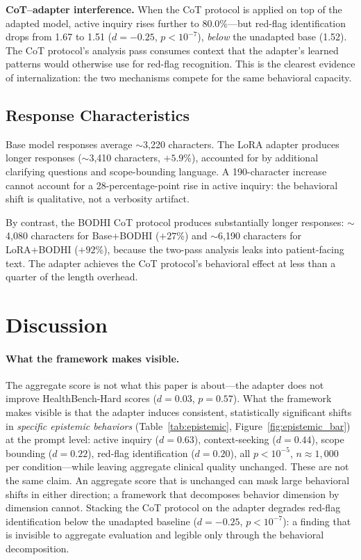 \documentclass{article}
\newcommand{\bodhi}{BODHI}
\begin{document}
\textbf{CoT--adapter interference.} When the CoT protocol is applied on top of the adapted model, active inquiry rises further to 80.0\%---but red-flag identification drops from 1.67 to 1.51 ($d = -0.25$, $p < 10^{-7}$), \emph{below} the unadapted base (1.52). The CoT protocol's analysis pass consumes context that the adapter's learned patterns would otherwise use for red-flag recognition. This is the clearest evidence of internalization: the two mechanisms compete for the same behavioral capacity.

\subsection{Response Characteristics}

Base model responses average ${\sim}$3,220 characters. The LoRA adapter produces longer responses (${\sim}$3,410 characters, $+5.9$\%), accounted for by additional clarifying questions and scope-bounding language. A 190-character increase cannot account for a 28-percentage-point rise in active inquiry: the behavioral shift is qualitative, not a verbosity artifact.

By contrast, the \bodhi{} CoT protocol produces substantially longer responses: ${\sim}$4,080 characters for Base+\bodhi{} ($+27$\%) and ${\sim}$6,190 characters for LoRA+\bodhi{} ($+92$\%), because the two-pass analysis leaks into patient-facing text. The adapter achieves the CoT protocol's behavioral effect at less than a quarter of the length overhead.



\section{Discussion}
\label{sec:discussion}

\paragraph{What the framework makes visible.} The aggregate score is not what this paper is about---the adapter does not improve HealthBench-Hard scores ($d=0.03$, $p=0.57$). What the framework makes visible is that the adapter induces consistent, statistically significant shifts in \emph{specific epistemic behaviors} (Table~\ref{tab:epistemic}, Figure~\ref{fig:epistemic_bar}) at the prompt level: active inquiry ($d=0.63$), context-seeking ($d=0.44$), scope bounding ($d=0.22$), red-flag identification ($d=0.20$), all $p < 10^{-5}$, $n\approx1{,}000$ per condition---while leaving aggregate clinical quality unchanged. These are not the same claim. An aggregate score that is unchanged can mask large behavioral shifts in either direction; a framework that decomposes behavior dimension by dimension cannot. Stacking the CoT protocol on the adapter degrades red-flag identification below the unadapted baseline ($d=-0.25$, $p < 10^{-7}$): a finding that is invisible to aggregate evaluation and legible only through the behavioral decomposition.
\end{document}
